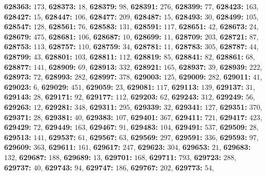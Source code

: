 \textsf{\bfseries 628363:} $173$, \textsf{\bfseries 628373:} $18$, \textsf{\bfseries 628379:} $98$, \textsf{\bfseries 628391:} $276$, \textsf{\bfseries 628399:} $77$, \textsf{\bfseries 628423:} $163$, \textsf{\bfseries 628427:} $15$, \textsf{\bfseries 628447:} $106$, \textsf{\bfseries 628477:} $209$, \textsf{\bfseries 628487:} $15$, \textsf{\bfseries 628493:} $30$, \textsf{\bfseries 628499:} $105$, \textsf{\bfseries 628547:} $128$, \textsf{\bfseries 628561:} $76$, \textsf{\bfseries 628583:} $131$, \textsf{\bfseries 628591:} $117$, \textsf{\bfseries 628651:} $42$, \textsf{\bfseries 628673:} $24$, \textsf{\bfseries 628679:} $475$, \textsf{\bfseries 628681:} $106$, \textsf{\bfseries 628687:} $10$, \textsf{\bfseries 628699:} $11$, \textsf{\bfseries 628709:} $203$, \textsf{\bfseries 628721:} $87$, \textsf{\bfseries 628753:} $113$, \textsf{\bfseries 628757:} $110$, \textsf{\bfseries 628759:} $34$, \textsf{\bfseries 628781:} $11$, \textsf{\bfseries 628783:} $305$, \textsf{\bfseries 628787:} $44$, \textsf{\bfseries 628799:} $43$, \textsf{\bfseries 628801:} $103$, \textsf{\bfseries 628811:} $112$, \textsf{\bfseries 628819:} $85$, \textsf{\bfseries 628841:} $82$, \textsf{\bfseries 628861:} $68$, \textsf{\bfseries 628877:} $141$, \textsf{\bfseries 628909:} $69$, \textsf{\bfseries 628913:} $332$, \textsf{\bfseries 628921:} $165$, \textsf{\bfseries 628937:} $39$, \textsf{\bfseries 628939:} $222$, \textsf{\bfseries 628973:} $72$, \textsf{\bfseries 628993:} $282$, \textsf{\bfseries 628997:} $378$, \textsf{\bfseries 629003:} $125$, \textsf{\bfseries 629009:} $282$, \textsf{\bfseries 629011:} $41$, \textsf{\bfseries 629023:} $6$, \textsf{\bfseries 629029:} $451$, \textsf{\bfseries 629059:} $23$, \textsf{\bfseries 629081:} $117$, \textsf{\bfseries 629113:} $139$, \textsf{\bfseries 629137:} $31$, \textsf{\bfseries 629143:} $28$, \textsf{\bfseries 629171:} $92$, \textsf{\bfseries 629177:} $112$, \textsf{\bfseries 629203:} $62$, \textsf{\bfseries 629243:} $312$, \textsf{\bfseries 629249:} $56$, \textsf{\bfseries 629263:} $12$, \textsf{\bfseries 629281:} $348$, \textsf{\bfseries 629311:} $295$, \textsf{\bfseries 629339:} $32$, \textsf{\bfseries 629341:} $127$, \textsf{\bfseries 629351:} $370$, \textsf{\bfseries 629371:} $28$, \textsf{\bfseries 629381:} $40$, \textsf{\bfseries 629383:} $107$, \textsf{\bfseries 629401:} $367$, \textsf{\bfseries 629411:} $721$, \textsf{\bfseries 629417:} $423$, \textsf{\bfseries 629429:} $72$, \textsf{\bfseries 629449:} $163$, \textsf{\bfseries 629467:} $91$, \textsf{\bfseries 629483:} $104$, \textsf{\bfseries 629491:} $537$, \textsf{\bfseries 629509:} $28$, \textsf{\bfseries 629513:} $141$, \textsf{\bfseries 629537:} $61$, \textsf{\bfseries 629567:} $63$, \textsf{\bfseries 629569:} $297$, \textsf{\bfseries 629591:} $336$, \textsf{\bfseries 629593:} $97$, \textsf{\bfseries 629609:} $363$, \textsf{\bfseries 629611:} $161$, \textsf{\bfseries 629617:} $247$, \textsf{\bfseries 629623:} $304$, \textsf{\bfseries 629653:} $21$, \textsf{\bfseries 629683:} $132$, \textsf{\bfseries 629687:} $188$, \textsf{\bfseries 629689:} $13$, \textsf{\bfseries 629701:} $168$, \textsf{\bfseries 629711:} $793$, \textsf{\bfseries 629723:} $288$, \textsf{\bfseries 629737:} $40$, \textsf{\bfseries 629743:} $94$, \textsf{\bfseries 629747:} $186$, \textsf{\bfseries 629767:} $202$, \textsf{\bfseries 629773:} $54$, 
